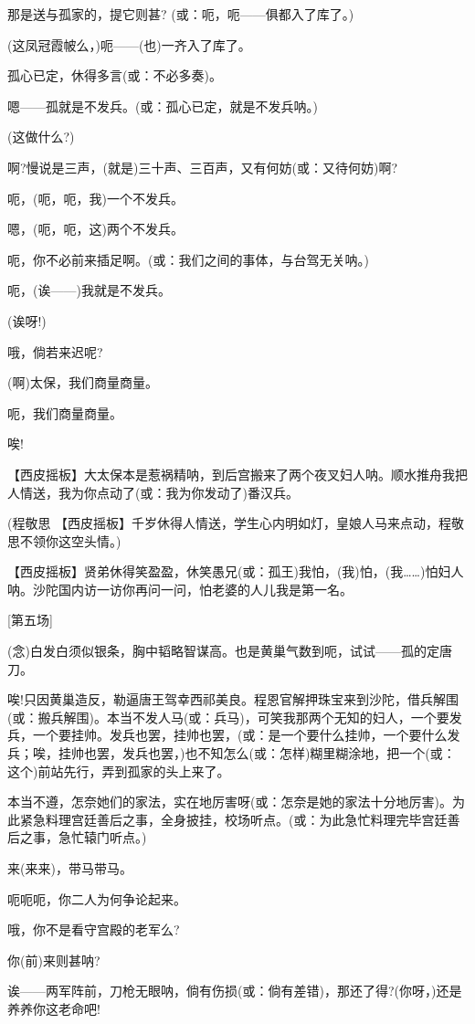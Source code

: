 那是送与孤家的，提它则甚? (或：呃，呃------俱都入了库了。)

(这凤冠霞帔么，)呃------(也)一齐入了库了。

孤心已定，休得多言(或：不必多奏)。

嗯------孤就是不发兵。(或：孤心已定，就是不发兵呐。)

(这做什么?)

啊?慢说是三声，(就是)三十声、三百声，又有何妨(或：又待何妨)啊?

呃，(呃，呃，我)一个不发兵。

嗯，(呃，呃，这)两个不发兵。

呃，你不必前来插足啊。(或：我们之间的事体，与台驾无关呐。)

呃，(诶------)我就是不发兵。

(诶呀!)

哦，倘若来迟呢?

(啊)太保，我们商量商量。

呃，我们商量商量。

唉!

【西皮摇板】大太保本是惹祸精呐，到后宫搬来了两个夜叉妇人呐。顺水推舟我把人情送，我为你点动了(或：我为你发动了)番汉兵。

(程敬思
【西皮摇板】千岁休得人情送，学生心内明如灯，皇娘人马来点动，程敬思不领你这空头情。)

【西皮摇板】贤弟休得笑盈盈，休笑愚兄(或：孤王)我怕，(我)怕，(我\ldots{}\ldots{})怕妇人呐。沙陀国内访一访你再问一问，怕老婆的人儿我是第一名。

{[}第五场{]}

(念)白发白须似银条，胸中韬略智谋高。也是黄巢气数到呃，试试------孤的定唐刀。

唉!只因黄巢造反，勒逼唐王驾幸西祁美良。程恩官解押珠宝来到沙陀，借兵解围(或：搬兵解围)。本当不发人马(或：兵马)，可笑我那两个无知的妇人，一个要发兵，一个要挂帅。发兵也罢，挂帅也罢，(或：是一个要什么挂帅，一个要什么发兵；唉，挂帅也罢，发兵也罢，)也不知怎么(或：怎样)糊里糊涂地，把一个(或：这个)前站先行，弄到孤家的头上来了。

本当不遵，怎奈她们的家法，实在地厉害呀(或：怎奈是她的家法十分地厉害)。为此紧急料理宫廷善后之事，全身披挂，校场听点。(或：为此急忙料理完毕宫廷善后之事，急忙辕门听点。)

来(来来)，带马带马。

呃呃呃，你二人为何争论起来。

哦，你不是看守宫殿的老军么?

你(前)来则甚呐?

诶------两军阵前，刀枪无眼呐，倘有伤损(或：倘有差错)，那还了得?(你呀，)还是养养你这老命吧!

